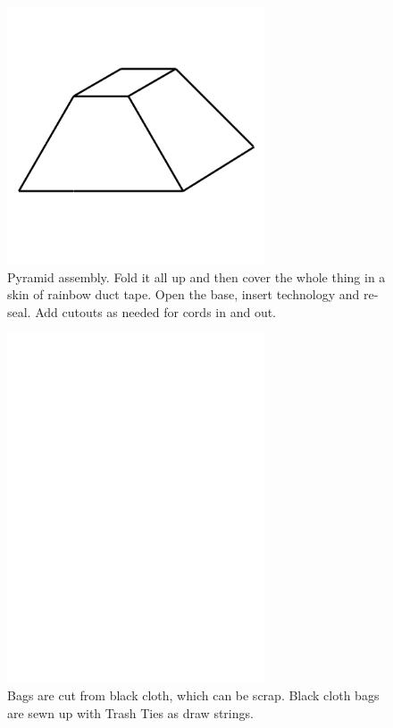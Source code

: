 \begin{figure}
	\centering
	\includegraphics[width=3in]{figures/actiongeometry/pyramid.png}
	\caption[pyramid]
	{Pyramid assembly.  Fold it all up and then cover the whole thing in a skin of rainbow duct tape.  Open the base, insert technology and re-seal.  Add cutouts as needed for cords in and out.}
\end{figure}

\begin{figure}
	\centering
	\includegraphics[width=3in]{figures/shapes/blank.png}
    \caption[bags]
	{Bags are cut from black cloth, which can be scrap.  Black cloth bags are sewn up with Trash Ties as draw strings.}
\end{figure}


